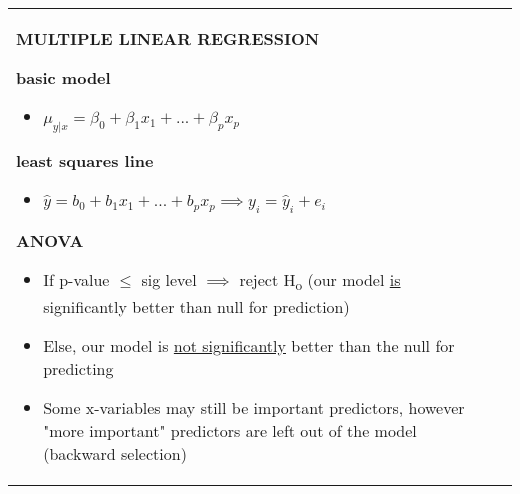 \documentclass[6pt]{article}
\begin{document}
\begin{footnotesize}
\begin{tabular}{l | l}
{\begin{flushleft}
\begin{itemize}
\end{itemize}

\begin{flushleft}
\textbf{MULTIPLE LINEAR REGRESSION}
\end{flushleft}

\begin{flushleft}
\textbf{basic model}
\end{flushleft}
\begin{itemize}
\item $\mu_{y|x} = \beta_{0} + \beta_{1}x_{1} + ... + \beta_{p}x_{p}$ 
\end{itemize}
\begin{flushleft}
\textbf{least squares line}
\end{flushleft}

\begin{itemize}
\item $\hat{y} = b_{0} + b_{1}x_{1} + ... + b_{p}x_{p} \implies y_{i} = \hat{y}_{i} + e_{i}$
\end{itemize}

\begin{flushleft}
\textbf{ANOVA}
\end{flushleft}

\begin{itemize}
\item If p-value $\le$ sig level $\implies$ reject H\textsubscript{o} (our model \underline{is} significantly better than null for prediction)
\item Else, our model is \underline{not significantly} better than the null for predicting
\item Some x-variables may still be important predictors, however "more important" predictors are left out of the model (backward selection)
\end{itemize}

\end{flushleft}

}
\end{tabular}

\end{footnotesize}
\end{document}
